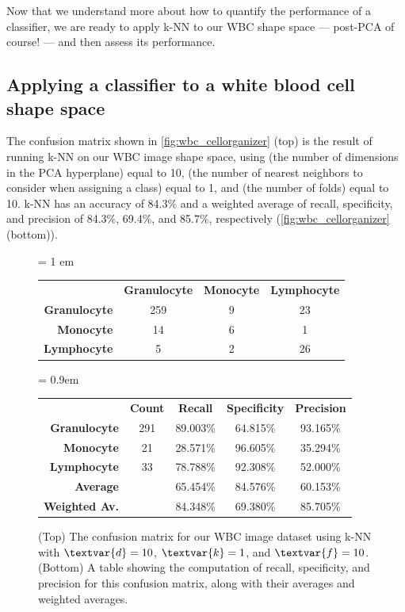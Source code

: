 Now that we understand more about how to quantify the performance of a classifier, we are ready to apply k-NN to our WBC shape space --- post-PCA of course! --- and then assess its performance.

\FloatBarrier
{}
\subsection{Applying a classifier to a white blood cell shape space}

The confusion matrix shown in \autoref{fig:wbc_cellorganizer} (top) is the result of running k-NN on our WBC image shape space, using  (the number of dimensions in the PCA hyperplane) equal to 10,  (the number of nearest neighbors to consider when assigning a class) equal to 1, and  (the number of folds) equal to 10. k-NN has an accuracy of 84.3\% and a weighted average of recall, specificity, and precision of 84.3\%, 69.4\%, and 85.7\%, respectively (\autoref{fig:wbc_cellorganizer} (bottom)).

\begin{figure}[h]
\centering
\tabcolsep = 1 em
\mySfFamily
\begin{tabular}{r c c c}
\rowcolor{gray!50}
& \textbf{Granulocyte} & \textbf{Monocyte} & \textbf{Lymphocyte} \\
\textbf{Granulocyte} & 259 & 9 & 23 \\
\textbf{Monocyte} & \phantom{5}14 & 6 & \phantom{5}1 \\
 \textbf{Lymphocyte} & \phantom{55}5 & 2 & 26
\end{tabular}

\phantom{Test}\vspace{\baselineskip}

\tabcolsep = 0.9em
\begin{tabular}{r c c c c}
\rowcolor{gray!50}
& \textbf{Count} & \textbf{Recall} & \textbf{Specificity} & \textbf{Precision} \\
\textbf{Granulocyte} & 291 & 89.003\% & 64.815\% & 93.165\%\\
\textbf{Monocyte} & 21 & 28.571\% & 96.605\% & 35.294\% \\
\textbf{Lymphocyte} & 33 & 78.788\% & 92.308\% & 52.000\%\\
\textbf{Average} & & 65.454\% & 84.576\% & 60.153\%\\
\textbf{Weighted Av.} & & 84.348\% & 69.380\% & 85.705\%\\
\end{tabular}
\caption{(Top) The confusion matrix for our WBC image dataset using k-NN with $\textvar{d} = \text{10}$, $\textvar{k} = \text{1}$, and $\textvar{f} = \text{10}$. (Bottom) A table showing the computation of recall, specificity, and precision for this confusion matrix, along with their averages and weighted averages.}
\label{fig:wbc_cellorganizer}
\end{figure}

